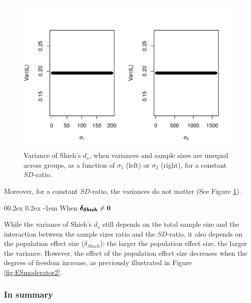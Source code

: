 \documentclass[
  english,
  man,mask]{apa6}
\makeatletter
\let\oldparagraph\paragraph
\renewcommand{\paragraph}[1]{\oldparagraph{#1}\mbox{}}
\renewcommand{\paragraph}{\@startsection{paragraph}{4}{\parindent}%
  {0\baselineskip \@plus 0.2ex \@minus 0.2ex}%
  {-1em}%
  {\normalfont\normalsize\bfseries\itshape\typesectitle}}
\makeatother
\begin{document}
\begin{figure}
\centering
\includegraphics{Theoretical-Variance-of-all-estimators-as-a-function-of-population-parameters_files/figure-latex/varshiehhetunbalvariance2-1.pdf}
\caption{\label{fig:varshiehhetunbalvariance2}Variance of Shieh's \(d_s\), when variances and sample sizes are unequal across groups, as a function of \(\sigma_1\) (left) or \(\sigma_2\) (right), for a constant \(SD\)-ratio.}
\end{figure}

Moreover, for a constant \(SD\)-ratio, the variances do not matter (See Figure \ref{fig:varshiehhetunbalvariance2}).

\hypertarget{when-bf-pmbdelta_shieh-neq-0-2}{%
\paragraph{\texorpdfstring{When \(\bf \pmb{\delta_{Shieh}} \neq 0\)}{When \textbackslash bf \textbackslash pmb\{\textbackslash delta\_\{Shieh\}\} \textbackslash neq 0}}\label{when-bf-pmbdelta_shieh-neq-0-2}}

While the variance of Shieh's \(d_s\) still depends on the total sample size and the interaction between the sample sizes ratio and the \(SD\)-ratio, it also depends on the population effect size (\(\delta_{Shieh}\)): the larger the population effect size, the larger the variance. However, the effect of the population effect size decreases when the degrees of freedom increase, as previously illustrated in Figure \ref{fig:ESmoderator2}.

\hypertarget{in-summary-3}{%
\subsubsection{In summary}\label{in-summary-3}}
\end{document}
